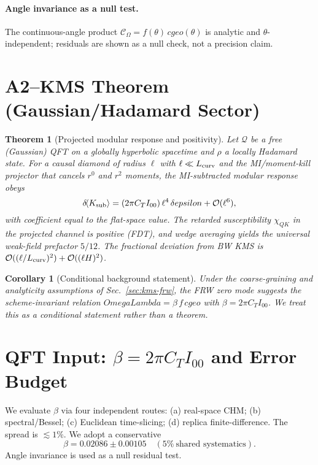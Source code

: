 \documentclass[aps,prd,onecolumn,superscriptaddress,nofootinbib]{revtex4-2}
\def\OmL{OmegaLambda}%
\def\cgeo{cgeo}%
\def\eps{epsilon}%
\def\Omega_\Lambda{OmegaLambda}%
\providecommand{\OmL}{\Omega_\Lambda}
\providecommand{\cgeo}{c_{\rm geo}}
\providecommand{\eps}{\varepsilon}
\providecommand{\be}{\begin{equation}}
\providecommand{\ee}{\end{equation}}
\newtheorem{theorem}{Theorem}
\newtheorem{corollary}{Corollary}
\begin{document}
\paragraph{Angle invariance as a null test.} The continuous-angle product \(\mathcal C_\Omega=f(\theta)\,\cgeo(\theta)\) is analytic and \(\theta\)-independent; residuals are shown as a null check, not a precision claim.

\section{A2–KMS Theorem (Gaussian/Hadamard Sector)}
\label{sec:theorem}

\begin{theorem}[Projected modular response and positivity]\label{thm:proj-modresp}
Let \(\mathcal Q\) be a free (Gaussian) QFT on a globally hyperbolic spacetime and \(\rho\) a locally Hadamard state. For a causal diamond of radius \(\ell\) with \(\ell\ll L_{\rm curv}\) and the MI/moment-kill projector that cancels \(r^0\) and \(r^2\) moments, the MI-subtracted modular response obeys
\be
\delta\!\langle K_{\rm sub}\rangle=(2\pi C_T I_{00})\,\ell^4\,\delta\eps+\mathcal O(\ell^6),
\ee
with coefficient equal to the flat-space value. The retarded susceptibility \(\chi_{QK}\) in the projected channel is positive (FDT), and wedge averaging yields the universal weak-field prefactor \(5/12\). The fractional deviation from BW KMS is \(\mathcal O((\ell/L_{\rm curv})^2)+\mathcal O((\ell H)^2)\).
\end{theorem}

\begin{corollary}[Conditional background statement]\label{cor:background-cond}
Under the coarse-graining and analyticity assumptions of Sec.~\ref{sec:kms-frw}, the FRW zero mode \emph{suggests} the scheme-invariant relation
\(\OmL=\beta\,f\,\cgeo\) with \(\beta=2\pi C_T I_{00}\). We treat this as a conditional statement rather than a theorem.
\end{corollary}

\section{QFT Input: \texorpdfstring{$\beta=2\pi C_T I_{00}$}{beta} and Error Budget}
\label{sec:beta}
We evaluate \(\beta\) via four independent routes: (a) real-space CHM; (b) spectral/Bessel; (c) Euclidean time-slicing; (d) replica finite-difference. The spread is \(\lesssim 1\%\). We adopt a conservative
\be
\beta=0.02086\pm 0.00105 \quad (5\%~\text{shared systematics}).
\ee
Angle invariance is used as a null residual test.
\end{document}
